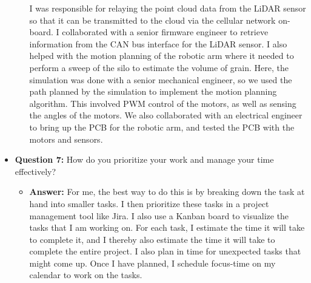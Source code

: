\documentclass{article}
\begin{document}
\begin{itemize}
\begin{itemize}
        I was responsible for
        relaying the point cloud data from the LiDAR sensor
        so that it can be transmitted to the cloud via the cellular network on-board.
        I collaborated with a senior firmware engineer to
        retrieve information from the CAN bus interface for the LiDAR sensor.
        I also helped with the motion planning of the robotic arm where it
        needed to perform a sweep of the silo to estimate the volume of grain. Here,
        the simulation was done with a senior mechanical engineer, so we
        used the path planned by the simulation to implement the motion
        planning algorithm. This involved PWM control of the motors, as well
        as sensing the angles of the motors. We also collaborated with an
        electrical engineer to bring up the PCB for the robotic arm, and
        tested the PCB with the motors and sensors.\\
    \end{itemize}
    
    \item \textbf{Question 7:} How do you prioritize your work and manage your time effectively?
    \begin{itemize}
        \item \textbf{Answer:} For me, the best way to do this is by breaking down
        the task at hand into smaller tasks. I then prioritize these tasks
        in a project management tool like Jira. I also use a Kanban board
        to visualize the tasks that I am working on. For each task,
        I estimate the time it will take to complete it, and I thereby also
        estimate the time it will take to complete the entire project. I also
        plan in time for unexpected tasks that might come up. Once I have
        planned, I schedule focus-time on my calendar to work on the tasks.
    \end{itemize}
    

\end{itemize}
\end{document}
